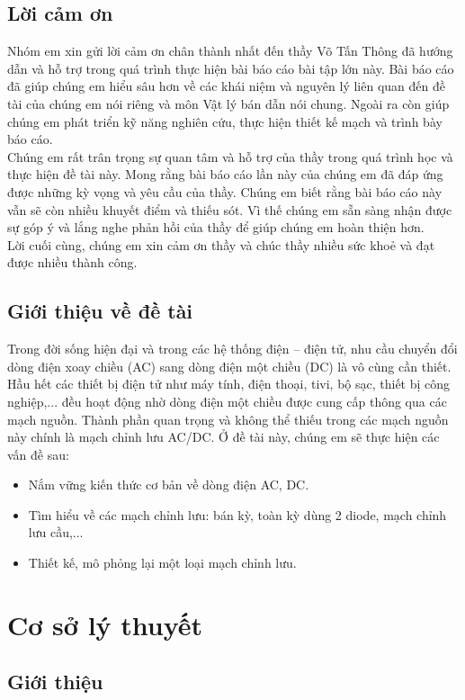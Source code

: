 \documentclass[a4paper,15pt]{article}
\begin{document}
\subsection{Lời cảm ơn}
Nhóm em xin gửi lời cảm ơn chân thành nhất đến thầy Võ Tấn Thông đã hướng dẫn và hỗ trợ trong quá trình thực hiện bài báo cáo bài tập lớn này. Bài báo cáo đã giúp chúng em hiểu sâu hơn về các khái niệm và nguyên lý liên quan đến đề tài của chúng em nói riêng và môn Vật lý bán dẫn nói chung. Ngoài ra còn giúp chúng em phát triển kỹ năng nghiên cứu, thực hiện thiết kế mạch và trình bày báo cáo. \\
Chúng em rất trân trọng sự quan tâm và hỗ trợ của thầy trong quá trình học và thực hiện đề tài này. Mong rằng bài báo cáo lần này của chúng em đã đáp ứng được những kỳ vọng và yêu cầu của thầy. Chúng em biết rằng bài báo cáo này vẫn sẽ còn nhiều khuyết điểm và thiếu sót. Vì thế chúng em sẵn sàng nhận được sự góp ý và lắng nghe phản hồi của thầy để giúp chúng em hoàn thiện hơn.\\
Lời cuối cùng, chúng em xin cảm ơn thầy và chúc thầy nhiều sức khoẻ và đạt được nhiều thành công.


\subsection{Giới thiệu về đề tài}
Trong đời sống hiện đại và trong các hệ thống điện – điện tử, nhu cầu chuyển đổi dòng điện xoay chiều (AC) sang dòng điện một chiều (DC) là vô cùng cần thiết. Hầu hết các thiết bị điện tử như máy tính, điện thoại, tivi, bộ sạc, thiết bị công nghiệp,... đều hoạt động nhờ dòng điện một chiều được cung cấp thông qua các mạch nguồn. Thành phần quan trọng và không thể thiếu trong các mạch nguồn này chính là mạch chỉnh lưu AC/DC. Ở đề tài này, chúng em sẽ thực hiện các vấn đề sau:
\begin{itemize}
    \item Nắm vững kiến thức cơ bản về dòng điện AC, DC.
    \item Tìm hiểu về các mạch chỉnh lưu: bán kỳ, toàn kỳ dùng 2 diode, mạch chỉnh lưu cầu,...
    \item Thiết kế, mô phỏng lại một loại mạch chỉnh lưu.
\end{itemize}
\newpage

\section{Cơ sở lý thuyết}
\subsection{Giới thiệu}
\end{document}
